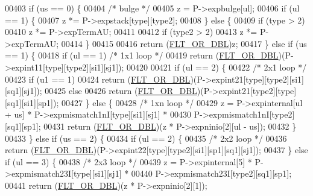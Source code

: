 \begin{DoxyCode}
00403     \textcolor{keywordflow}{if} (us == 0) \{
00404       \textcolor{comment}{/* bulge */}
00405       z = P->expbulge[ul];
00406       \textcolor{keywordflow}{if} (ul == 1) \{
00407         z *= P->expstack[type][type2];
00408       \} \textcolor{keywordflow}{else} \{
00409         \textcolor{keywordflow}{if} (type > 2)
00410           z *= P->expTermAU;
00411 
00412         \textcolor{keywordflow}{if} (type2 > 2)
00413           z *= P->expTermAU;
00414       \}
00415 
00416       \textcolor{keywordflow}{return} (\hyperlink{group__data__structures_ga31125aeace516926bf7f251f759b6126}{FLT\_OR\_DBL})z;
00417     \} \textcolor{keywordflow}{else} \textcolor{keywordflow}{if} (us == 1) \{
00418       \textcolor{keywordflow}{if} (ul == 1)                     \textcolor{comment}{/* 1x1 loop */}
00419         \textcolor{keywordflow}{return} (\hyperlink{group__data__structures_ga31125aeace516926bf7f251f759b6126}{FLT\_OR\_DBL})(P->expint11[type][type2][si1][sj1]);
00420 
00421       \textcolor{keywordflow}{if} (ul == 2) \{
00422         \textcolor{comment}{/* 2x1 loop */}
00423         \textcolor{keywordflow}{if} (u1 == 1)
00424           \textcolor{keywordflow}{return} (\hyperlink{group__data__structures_ga31125aeace516926bf7f251f759b6126}{FLT\_OR\_DBL})(P->expint21[type][type2][si1][sq1][sj1]);
00425         \textcolor{keywordflow}{else}
00426           \textcolor{keywordflow}{return} (\hyperlink{group__data__structures_ga31125aeace516926bf7f251f759b6126}{FLT\_OR\_DBL})(P->expint21[type2][type][sq1][si1][sp1]);
00427       \} \textcolor{keywordflow}{else} \{
00428         \textcolor{comment}{/* 1xn loop */}
00429         z = P->expinternal[ul + us] * P->expmismatch1nI[type][si1][sj1] *
00430             P->expmismatch1nI[type2][sq1][sp1];
00431         \textcolor{keywordflow}{return} (\hyperlink{group__data__structures_ga31125aeace516926bf7f251f759b6126}{FLT\_OR\_DBL})(z * P->expninio[2][ul - us]);
00432       \}
00433     \} \textcolor{keywordflow}{else} \textcolor{keywordflow}{if} (us == 2) \{
00434       \textcolor{keywordflow}{if} (ul == 2) \{
00435         \textcolor{comment}{/* 2x2 loop */}
00436         \textcolor{keywordflow}{return} (\hyperlink{group__data__structures_ga31125aeace516926bf7f251f759b6126}{FLT\_OR\_DBL})(P->expint22[type][type2][si1][sp1][sq1][sj1]);
00437       \} \textcolor{keywordflow}{else} \textcolor{keywordflow}{if} (ul == 3) \{
00438         \textcolor{comment}{/* 2x3 loop */}
00439         z = P->expinternal[5] * P->expmismatch23I[type][si1][sj1] *
00440             P->expmismatch23I[type2][sq1][sp1];
00441         \textcolor{keywordflow}{return} (\hyperlink{group__data__structures_ga31125aeace516926bf7f251f759b6126}{FLT\_OR\_DBL})(z * P->expninio[2][1]);

\end{DoxyCode}
